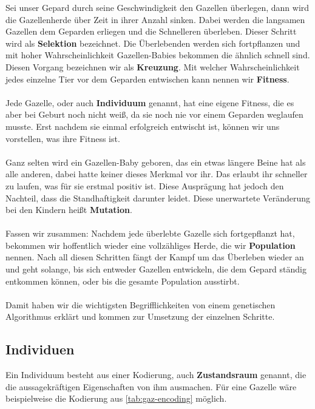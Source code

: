         \noindent
        Sei unser Gepard durch seine Geschwindigkeit den Gazellen überlegen, dann wird die Gazellenherde über Zeit in ihrer Anzahl sinken. Dabei werden die langsamen Gazellen dem Geparden erliegen und die Schnelleren überleben. Dieser Schritt wird als \textbf{Selektion} bezeichnet. Die Überlebenden werden sich fortpflanzen und mit hoher Wahrscheinlichkeit Gazellen-Babies bekommen die ähnlich schnell sind. Diesen Vorgang bezeichnen wir als \textbf{Kreuzung}. Mit welcher Wahrscheinlichkeit jedes einzelne Tier vor dem Geparden entwischen kann nennen wir \textbf{Fitness}.\\
        \\
        Jede Gazelle, oder auch \textbf{Individuum} genannt, hat eine eigene Fitness, die es aber bei Geburt noch nicht weiß, da sie noch nie vor einem Geparden weglaufen musste. Erst nachdem sie einmal erfolgreich entwischt ist, können wir uns vorstellen, was ihre Fitness ist.\\
        \\
        Ganz selten wird ein Gazellen-Baby geboren, das ein etwas längere Beine hat als alle anderen, dabei hatte keiner dieses Merkmal vor ihr. Das erlaubt ihr schneller zu laufen, was für sie erstmal positiv ist. Diese Ausprägung hat jedoch den Nachteil, dass die Standhaftigkeit darunter leidet. Diese unerwartete Veränderung bei den Kindern heißt \textbf{Mutation}.\\
        \\
        Fassen wir zusammen: Nachdem jede überlebte Gazelle sich fortgepflanzt hat, bekommen wir hoffentlich wieder eine vollzähliges Herde, die wir \textbf{Population} nennen. Nach all diesen Schritten fängt der Kampf um das Überleben wieder an und geht solange, bis sich entweder Gazellen entwickeln, die dem Gepard ständig entkommen können, oder bis die gesamte Population ausstirbt.\\
        \\
        Damit haben wir die wichtigsten Begrifflichkeiten von einem genetischen Algorithmus erklärt und kommen zur Umsetzung der einzelnen Schritte.

        \subsection{Individuen}

            Ein Individuum besteht aus einer Kodierung, auch \textbf{Zustandsraum} genannt, die die aussagekräftigen Eigenschaften von ihm ausmachen. Für eine Gazelle wäre beispielweise die Kodierung aus \ref{tab:gaz-encoding} möglich.

